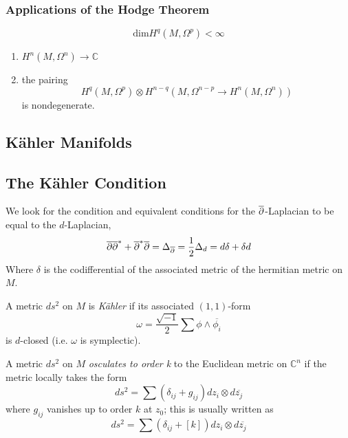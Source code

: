 \subsubsection{Applications of the Hodge Theorem}

\begin{thm}

\[
	\mathrm{dim} H^q (M, \Omega^p) < \infty
\]


\end{thm}

\begin{thm}

\begin{enumerate}
	\item $ H^n \left( M, \Omega^n \right) \xrightarrow{~} \mathbb{C}$
	\item the pairing
		\[
			H^q \left( M, \Omega^p \right) \otimes H^{ n-q } \left( M, \Omega^{ n-p } \to H^n \left( M, \Omega^n \right) \right)
		\]
		is nondegenerate.
		
\end{enumerate}

\end{thm}

\subsection{K\"ahler Manifolds}
\subsection{The K\"ahler Condition}
We look for the condition and equivalent conditions for the $ \overline{\partial}$-Laplacian to be equal to the $d$-Laplacian,
\[
\overline{\partial} \overline{\partial}^* + \overline{\partial}^* \overline{\partial}  = \Delta_{ \overline{\partial} } = \frac{1}{2} \Delta_d = d \delta+ \delta d
\]
Where $ \delta$ is the codifferential of the associated metric of the hermitian metric on $M$.

\begin{defn}

	A metric $ ds^2$ on $M$ is \textit{K\"ahler} if its associated $(1,1)$-form
	\[
	\omega = \frac{ \sqrt{-1}}{2} \sum \phi \wedge \overline{ \phi_i}
	\]
	is $d$-closed (i.e. $ \omega$ is symplectic).

\end{defn}

\begin{defn}

A metric $ds^2$ on $M$ \textit{osculates to order k} to the Euclidean metric on $ \mathbb{C}^n$ if the metric locally takes the form
\[
	ds^2 = \sum \left( \delta_{ ij } + g_{ ij } \right) dz_i \otimes d \overline{z_j}
\]
where $ g_{ ij }$ vanishes up to order $k$ at $z_0$; this is usually written as
\[
	ds^2 = \sum \left( \delta_{ ij } + \left[ k \right] \right) dz_i \otimes d \overline{z_j}
\]


\end{defn}


